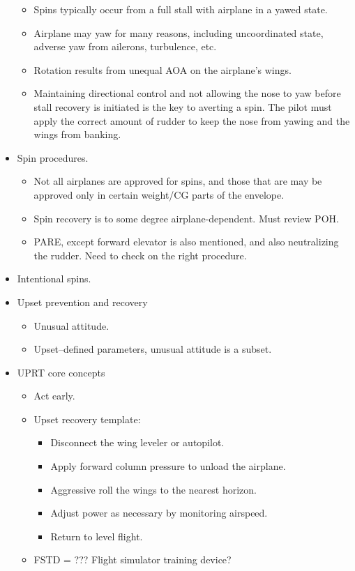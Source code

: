 \documentclass[letterpaper,10pt,titlepage]{article}
\begin{document}
\begin{itemize}
\begin{itemize}
	  \item Spins typically occur from a full stall with airplane in a yawed state.
	  \item Airplane may yaw for many reasons, including uncoordinated state, adverse yaw from ailerons,
	        turbulence, etc.
	  \item Rotation results from unequal AOA on the airplane's wings.
	  \item Maintaining directional control and not allowing the nose to yaw
	        before stall recovery is initiated is the key to averting a spin.  The
			pilot must apply the correct amount of rudder to keep the nose from yawing and
			the wings from banking.
	  \end{itemize}
\item Spin procedures.
	  \begin{itemize}
	  \item Not all airplanes are approved for spins, and those that are may be approved
	        only in certain weight/CG parts of the envelope.
	  \item Spin recovery is to some degree airplane-dependent.  Must review POH.
	  \item PARE, except forward elevator is also mentioned, and also neutralizing
	        the rudder.  Need to check on the right procedure.
	  \end{itemize}
\item Intentional spins.
\item Upset prevention and recovery
	  \begin{itemize}
	  \item Unusual attitude.
	  \item Upset--defined parameters, unusual attitude is a subset.
	  \end{itemize}
\item UPRT core concepts
	  \begin{itemize}
	  \item Act early.
	  \item Upset recovery template:
	        \begin{itemize}
			\item Disconnect the wing leveler or autopilot.
       	    \item Apply forward column pressure to unload the airplane.
			\item Aggressive roll the wings to the nearest horizon.
			\item Adjust power as necessary by monitoring airspeed.
			\item Return to level flight.
	        \end{itemize}
	  \item FSTD = ???  Flight simulator training device?
	  \end{itemize}
\end{itemize}
\end{document}
